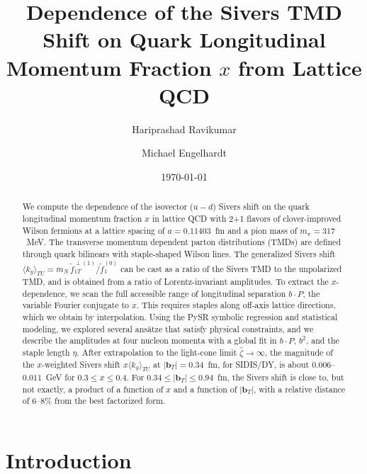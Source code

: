 \documentclass[aps,prd,twocolumn,amsmath,amssymb,floatfix]{revtex4-2}
\newcommand{\vect}[1]{\ensuremath{\boldsymbol{#1}}}
\begin{document}
\title{Dependence of the Sivers TMD Shift on Quark Longitudinal Momentum Fraction $x$ from Lattice QCD}

\author{Hariprashad Ravikumar}
\author{Michael Engelhardt}

\date{\today}

\begin{abstract}
We compute the dependence of the isovector ($u-d$) Sivers shift on the quark longitudinal momentum fraction $x$ in lattice QCD with 2+1 flavors of clover-improved Wilson fermions at a lattice spacing of $a=0.11403$~fm and a pion mass of $m_\pi=317$~MeV. The transverse momentum dependent parton distributions (TMDs) are defined through quark bilinears with staple-shaped Wilson lines. The generalized Sivers shift $\langle k_y\rangle_{TU}=m_N\,\tilde f_{1T}^{\perp(1)}/\tilde f_1^{(0)}$ can be cast as a ratio of the Sivers TMD to the unpolarized TMD, and is obtained from a ratio of Lorentz-invariant amplitudes. To extract the $x$-dependence, we scan the full accessible range of longitudinal separation $b\cdot P$, the variable Fourier conjugate to $x$. This requires staples along off-axis lattice directions, which we obtain by interpolation.
Using the PySR symbolic regression and statistical modeling, we explored several ans\"atze that satisfy physical constraints, and we describe the amplitudes at four nucleon momenta with a global fit in $b\cdot P$, $b^2$, and the staple length $\eta$. After extrapolation to the light-cone limit $\hat\zeta\to\infty$, the magnitude of the $x$-weighted Sivers shift $x\langle k_y\rangle_{TU}$ at $|\vect{b}_T|=0.34$~fm, for SIDIS/DY, is about $0.006$--$0.011$~GeV for $0.3\le x\le 0.4$. For $0.34\le|\vect{b}_T|\le 0.94$~fm, the Sivers shift is close to, but not exactly, a product of a function of $x$ and a function of $|\vect{b}_T|$, with a relative distance of 6--8\% from the best factorized form.
\end{abstract}

\maketitle

\section{Introduction}
\label{sec:intro}
\end{document}
